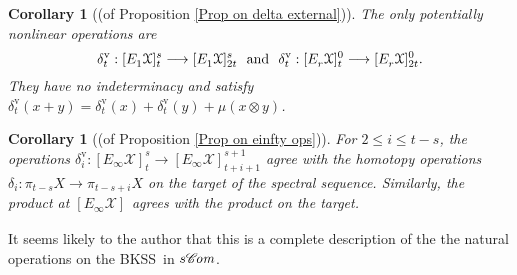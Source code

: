 \documentclass[11pt]{amsart} \renewcommand{\baselinestretch}{1.2}
\theoremstyle{plain}
\newtheorem{cor}[thm]{Corollary}
\numberwithin{equation}{section} %
\theoremstyle{plain}
\newtheorem{cor}[thm]{Corollary}
\numberwithin{equation}{chapter} %
\renewcommand{\to}{\longrightarrow}
\newcommand{\scrC}{\mathscr{C}}
\newcommand{\calx}{\mathcal{X}}
\newcommand{\algs}{{\scrC\!\textit{\normalfont\textit{om}}}}
\newcommand{\E}[5]{[E^{#1}_{#2}#3]^{#4}_{#5}}
\newcommand{\uver}{^\mathrm{v}}
\newcommand{\dhor}{_\mathrm{h}}
\newcommand{\Sqh}{\mathrm{Sq}\dhor}
\newcommand{\deltav}{\delta\uver}
\newcommand{\BKSS}{BKSS}
\begin{document}
\begin{Operations on the Bousfield-Kan spectral sequence}
\begin{cor}[(of Proposition \ref{Prop on delta external})]
The only potentially nonlinear operations are
\[
\deltav_t: \E{}{1}{\calx}{s}{t}\to  \E{}{1}{\calx}{s}{2t}\textup{ \ and \ } \deltav_t: \E{}{r}{\calx}{0}{t}\to  \E{}{r}{\calx}{0}{2t}.
\]
They  have no indeterminacy and satisfy $\deltav_t(x+y)=\deltav_t(x)+\deltav_t(y)+\mu(x\otimes y)$.
%
%
%
%
%
%
%
%
%
\end{cor}


\begin{cor}[(of Proposition \ref{Prop on einfty ops})]
\label{Prop on einfty ops composed with lift}
For $2\leq i\leq t-s$, the operations $\deltav_i:\E{}{\infty}{\calx}{s}{t}\to \E{}{\infty}{\calx}{s+1}{t+i+1}$ agree with the homotopy operations $\delta_i:\pi_{t-s}X\to \pi_{t-s+i}X$ on the target of the spectral sequence. Similarly, the product at $\E{}{\infty}{\calx}{}{}$ agrees with the product on the target.
\end{cor}

It seems likely to the author that this is a complete description of the the natural operations on the \BKSS\ in $s\algs$.




\end{Operations on the Bousfield-Kan spectral sequence}
\end{document}
